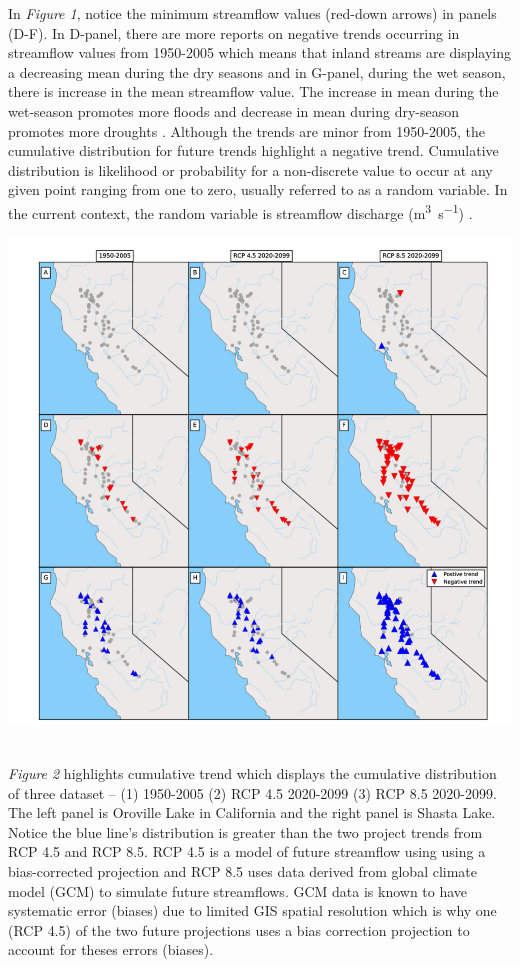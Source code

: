 \documentclass[a4paper,man,biblatex]{apa7}
\begin{document}
\par In \textit{Figure 1}, notice the minimum streamflow values (red-down arrows) in panels (D-F). In D-panel, there are more reports on negative trends occurring in streamflow values from 1950-2005 which means that inland streams are displaying a decreasing mean during the dry seasons and in G-panel, during the wet season, there is increase in the mean streamflow value. The increase in mean during the wet-season promotes more floods and decrease in mean during dry-season promotes more droughts \autocite{mallakpour_2018}. Although the trends are minor from 1950-2005, the cumulative distribution for future trends highlight a negative trend. Cumulative distribution is likelihood or probability for a non-discrete value to occur at any given point ranging from one to zero, usually referred to as a random variable. In the current context, the random variable is streamflow discharge (\si{\cubic\meter\per\second}) \autocite{cdf_def}.
 \begin{minipage}{0.65\linewidth}   
     \includegraphics[scale=0.35]{stream_flow_cali.png}
     \label{fig:streamflow_trend}
\end{minipage}
\vspace{2ex}

\\\textit{Figure 2} highlights cumulative trend which displays the cumulative distribution of three dataset -- (1) 1950-2005 (2) RCP 4.5 2020-2099 (3) RCP 8.5 2020-2099. The left panel is Oroville Lake in California and the right panel is Shasta Lake. Notice the blue line's distribution is greater than the two project trends from RCP 4.5 and RCP 8.5. RCP 4.5 is a model of future streamflow using using a bias-corrected projection and RCP 8.5 uses data derived from global climate model (GCM) to simulate future streamflows. GCM data is known to have systematic error (biases) due to limited GIS spatial resolution which is why one (RCP 4.5) of the two future projections uses a bias correction projection to account for theses errors (biases).
\end{document}
